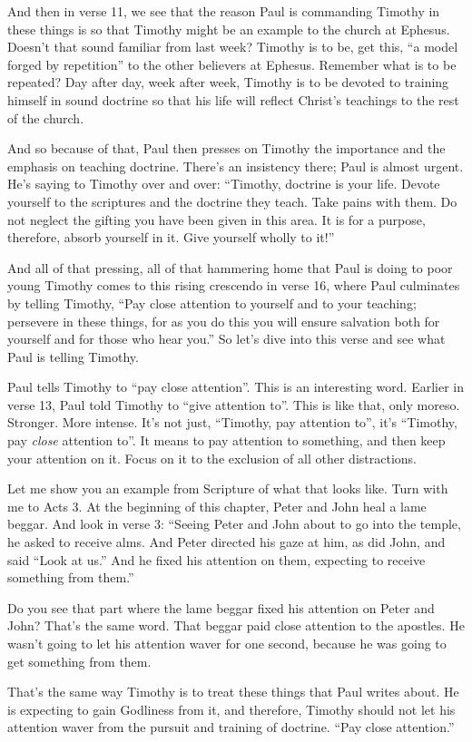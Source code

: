 \documentclass[letterpaper, 12pt]{article}
\begin{document}
    And then in verse 11, we see that the reason Paul is commanding
    Timothy in these things is so that Timothy might be an example to
    the church at Ephesus. Doesn't that sound familiar from last week?
    Timothy is to be, get this, ``a model forged by repetition'' to the
    other believers at Ephesus. Remember what is to be repeated? Day
    after day, week after week, Timothy is to be devoted to training
    himself in sound doctrine so that his life will reflect Christ's
    teachings to the rest of the church. 

    And so because of that, Paul then presses on Timothy the importance
    and the emphasis on teaching doctrine. There's an insistency there;
    Paul is almost urgent. He's saying to Timothy over and over:
    ``Timothy, doctrine is your life. Devote yourself to the scriptures
    and the doctrine they teach. Take pains with them. Do not neglect
    the gifting you have been given in this area. It is for a purpose,
    therefore, absorb yourself in it. Give yourself wholly to it!''

    And all of that pressing, all of that hammering home that Paul is
    doing to poor young Timothy comes to this rising crescendo in verse
    16, where Paul culminates by telling Timothy, ``Pay close attention
    to yourself and to your teaching; persevere in these things, for as
    you do this you will ensure salvation both for yourself and for
    those who hear you.'' So let's dive into this verse and see what
    Paul is telling Timothy.

    Paul tells Timothy to ``pay close attention''. This is an
    interesting word. Earlier in verse 13, Paul told Timothy to ``give
    attention to''. This is like that, only moreso. Stronger. More
    intense. It's not just, ``Timothy, pay attention to'', it's
    ``Timothy, pay \emph{close} attention to''. It means to pay
    attention to something, and then keep your attention on it. Focus on
    it to the exclusion of all other distractions.

    Let me show you an example from Scripture of what that looks like.
    Turn with me to Acts 3. At the beginning of this chapter, Peter and
    John heal a lame beggar. And look in verse 3: ``Seeing Peter and
    John about to go into the temple, he asked to receive alms. And
    Peter directed his gaze at him, as did John, and said ``Look at
    us.'' And he fixed his attention on them, expecting to receive
    something from them.''

    Do you see that part where the lame beggar fixed his attention on
    Peter and John? That's the same word. That beggar paid close
    attention to the apostles. He wasn't going to let his attention
    waver for one second, because he was going to get something from
    them.

    That's the same way Timothy is to treat these things that Paul
    writes about. He is expecting to gain Godliness from it, and
    therefore, Timothy should not let his attention waver from the
    pursuit and training of doctrine. ``Pay close attention.''
\end{document}
